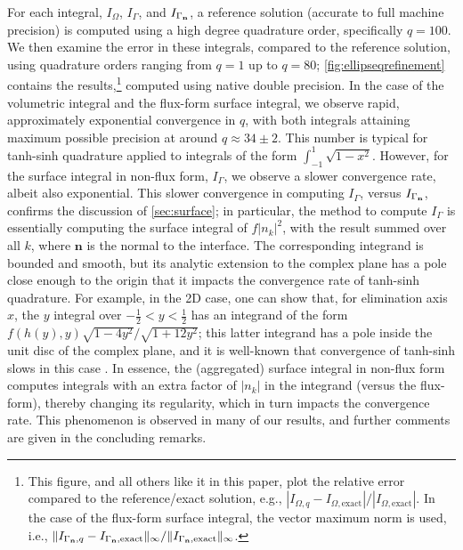 \documentclass[onefignum,onetabnum,onealgnum,oneeqnum]{siamart190516}
\begin{document}
For each integral, $I_{\Omega}$, $I_{\Gamma}$, and $I_{\Gamma_{\textbf n}}$, a reference solution (accurate to full machine precision) is computed using a high degree quadrature order, specifically $q = 100$. We then examine the error in these integrals, compared to the reference solution, using quadrature orders ranging from $q = 1$ up to $q = 80$; \cref{fig:ellipseqrefinement} contains the results,\footnote{This figure, and all others like it in this paper, plot the relative error compared to the reference/exact solution, e.g., $|I_{\Omega,q} - I_{\Omega,\text{exact}}| / |I_{\Omega,\text{exact}}|$. In the case of the flux-form surface integral, the vector maximum norm is used, i.e., $\|I_{\Gamma_{\textbf n},q} - I_{\Gamma_{\textbf n},\text{exact}}\|_\infty / \|I_{\Gamma_{\textbf n},\text{exact}}\|_\infty$.} computed using native double precision. In the case of the volumetric integral and the flux-form surface integral, we observe rapid,  approximately exponential convergence in $q$, with both integrals attaining maximum possible precision at around $q \approx 34 \pm 2$. This number is typical for tanh-sinh quadrature applied to integrals of the form $\int_{-1}^1 \sqrt{1 - x^2}$. However, for the surface integral in non-flux form, $I_{\Gamma}$, we observe a slower convergence rate, albeit also exponential. This slower convergence in computing $I_{\Gamma}$, versus $I_{\Gamma_{\textbf n}}$, confirms the discussion of \cref{sec:surface}; in particular, the method to compute $I_{\Gamma}$ is essentially computing the surface integral of $f |n_k|^2$, with the result summed over all $k$, where $\mathbf n$ is the normal to the interface. The corresponding integrand is bounded and smooth, but its analytic extension to the complex plane has a pole close enough to the origin that it impacts the convergence rate of tanh-sinh quadrature. For example, in the 2D case, one can show that, for elimination axis $\hat x$, the $y$ integral over $-\tfrac12 < y < \tfrac12$ has an integrand of the form $f(h(y),y) \sqrt{1 - 4 y^2} / \sqrt{1 + 12 y^2}$; this latter integrand has a pole inside the unit disc of the complex plane, and it is well-known that convergence of tanh-sinh slows in this case \cite{doi:10.1137/130932132}. In essence, the (aggregated) surface integral in non-flux form computes integrals with an extra factor of $|n_k|$ in the integrand (versus the flux-form), thereby changing its regularity, which in turn impacts the convergence rate. This phenomenon is observed in many of our results, and further comments are given in the concluding remarks. 
\end{document}
